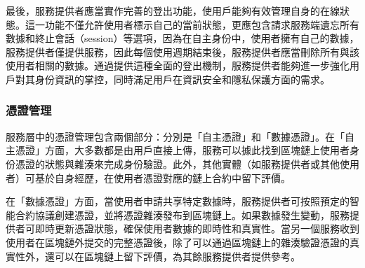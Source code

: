 最後，服務提供者應當實作完善的登出功能，使用戶能夠有效管理自身的在線狀態。這一功能不僅允許使用者標示自己的當前狀態，更應包含請求服務端遺忘所有數據和終止會話（session）等選項，因為在自主身份中，使用者擁有自己的數據，服務提供者僅提供服務，因此每個使用週期結束後，服務提供者應當刪除所有與該使用者相關的數據。通過提供這種全面的登出機制，服務提供者能夠進一步強化用戶對其身份資訊的掌控，同時滿足用戶在資訊安全和隱私保護方面的需求。
\subsubsection{憑證管理}
服務層中的憑證管理包含兩個部分：分別是「自主憑證」和「數據憑證」。在「自主憑證」方面，大多數都是由用戶直接上傳，服務可以據此找到區塊鏈上使用者身份憑證的狀態與雜湊來完成身份驗證。此外，其他實體（如服務提供者或其他使用者）可基於自身經歷，在使用者憑證對應的鏈上合約中留下評價。

在「數據憑證」方面，當使用者申請共享特定數據時，服務提供者可按照預定的智能合約協議創建憑證，並將憑證雜湊發布到區塊鏈上。如果數據發生變動，服務提供者可即時更新憑證狀態，確保使用者數據的即時性和真實性。當另一個服務收到使用者在區塊鏈外提交的完整憑證後，除了可以通過區塊鏈上的雜湊驗證憑證的真實性外，還可以在區塊鏈上留下評價，為其餘服務提供者提供參考。
